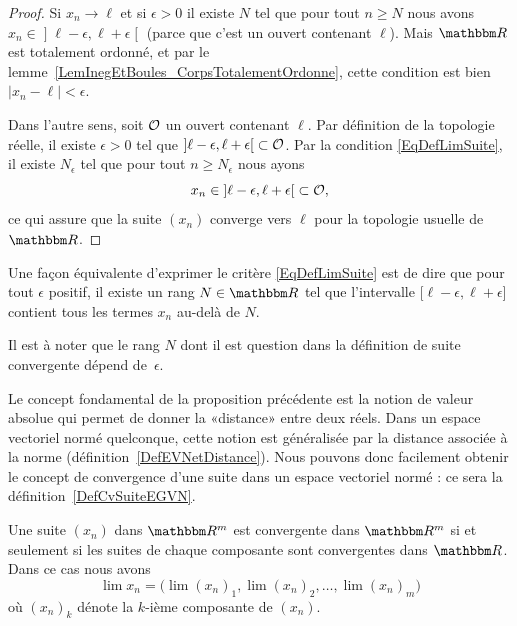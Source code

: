 \begin{proof}
  Si \( x_n\to \ell\) et si \( \epsilon>0\) il existe \( N \) tel que pour tout \( n\geq N\) nous avons \( x_n\in \mathopen ]\ell-\epsilon,\ell+\epsilon\mathclose[\) (parce que c'est un ouvert contenant \( \ell\)). Mais \( \eR\) est totalement ordonné, et par le lemme~\ref{LemInegEtBoules_CorpsTotalementOrdonne}, cette condition est bien \( | x_n-\ell |<\epsilon\).

    Dans l'autre sens, soit \( \mathcal{O}\) un ouvert contenant \( \ell\). Par définition de la topologie réelle, il existe \( \epsilon > 0 \) tel que \( ]\ell-\epsilon, \ell+\epsilon\mathclose[\subset\mathcal{O} \). Par la condition \eqref{EqDefLimSuite}, il existe \( N_{\epsilon} \) tel que pour tout \( n\geq N_{\epsilon}\) nous ayons
    \begin{equation}
        x_n\in \mathopen]\ell-\epsilon, \ell+\epsilon\mathclose[\subset\mathcal{O},
    \end{equation}
    ce qui assure que la suite \( (x_n)\) converge vers \( \ell\) pour la topologie usuelle de \( \eR\).
\end{proof}

Une façon équivalente d'exprimer le critère \eqref{EqDefLimSuite} est de dire que pour tout $\epsilon$ positif, il existe un rang $N\in\eR$ tel que l'intervalle $\mathopen[ \ell-\epsilon , \ell+\epsilon \mathclose]$ contient tous les termes $x_n$ au-delà de $N$.

Il est à noter que le rang $N$ dont il est question dans la définition de suite convergente dépend de~$\epsilon$.

Le concept fondamental de la proposition précédente est la notion de valeur absolue qui permet de donner la «distance» entre deux réels. Dans un espace vectoriel normé quelconque, cette notion est généralisée par la distance associée à la norme (définition~\ref{DefEVNetDistance}). Nous pouvons donc facilement obtenir le concept de convergence d'une suite dans un espace vectoriel normé : ce sera la définition~\ref{DefCvSuiteEGVN}.

\begin{proposition}		\label{PropCvRpComposante}
	Une suite $(x_n)$ dans $\eR^m$ est convergente dans $\eR^m$ si et seulement si les suites de chaque composante sont convergentes dans $\eR$. Dans ce cas nous avons
	 \begin{equation}
		 \lim x_n=\Big( \lim(x_n)_1,\lim (x_n)_2,\ldots,\lim (x_n)_m \Big)
	 \end{equation}
	 où $(x_n)_k$ dénote la $k$-ième composante de $(x_n)$.
\end{proposition}

